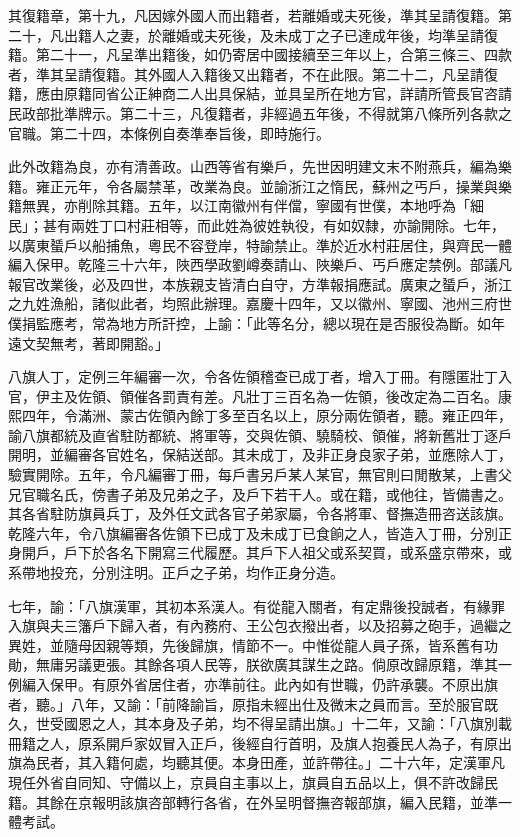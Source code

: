\begin{pinyinscope}
其復籍章，第十九，凡因嫁外國人而出籍者，若離婚或夫死後，準其呈請復籍。第二十，凡出籍人之妻，於離婚或夫死後，及未成丁之子已達成年後，均準呈請復籍。第二十一，凡呈準出籍後，如仍寄居中國接續至三年以上，合第三條三、四款者，準其呈請復籍。其外國人入籍後又出籍者，不在此限。第二十二，凡呈請復籍，應由原籍同省公正紳商二人出具保結，並具呈所在地方官，詳請所管長官咨請民政部批準牌示。第二十三，凡復籍者，非經過五年後，不得就第八條所列各款之官職。第二十四，本條例自奏準奉旨後，即時施行。

此外改籍為良，亦有清善政。山西等省有樂戶，先世因明建文末不附燕兵，編為樂籍。雍正元年，令各屬禁革，改業為良。並諭浙江之惰民，蘇州之丐戶，操業與樂籍無異，亦削除其籍。五年，以江南徽州有伴儅，寧國有世僕，本地呼為「細民」；甚有兩姓丁口村莊相等，而此姓為彼姓執役，有如奴隸，亦諭開除。七年，以廣東蜑戶以船捕魚，粵民不容登岸，特諭禁止。準於近水村莊居住，與齊民一體編入保甲。乾隆三十六年，陜西學政劉嶟奏請山、陜樂戶、丐戶應定禁例。部議凡報官改業後，必及四世，本族親支皆清白自守，方準報捐應試。廣東之蜑戶，浙江之九姓漁船，諸似此者，均照此辦理。嘉慶十四年，又以徽州、寧國、池州三府世僕捐監應考，常為地方所訐控，上諭：「此等名分，總以現在是否服役為斷。如年遠文契無考，著即開豁。」

八旗人丁，定例三年編審一次，令各佐領稽查已成丁者，增入丁冊。有隱匿壯丁入官，伊主及佐領、領催各罰責有差。凡壯丁三百名為一佐領，後改定為二百名。康熙四年，令滿洲、蒙古佐領內餘丁多至百名以上，原分兩佐領者，聽。雍正四年，諭八旗都統及直省駐防都統、將軍等，交與佐領、驍騎校、領催，將新舊壯丁逐戶開明，並編審各官姓名，保結送部。其未成丁，及非正身良家子弟，並應除人丁，驗實開除。五年，令凡編審丁冊，每戶書另戶某人某官，無官則曰閒散某，上書父兄官職名氏，傍書子弟及兄弟之子，及戶下若干人。或在籍，或他往，皆備書之。其各省駐防旗員兵丁，及外任文武各官子弟家屬，令各將軍、督撫造冊咨送該旗。乾隆六年，令八旗編審各佐領下已成丁及未成丁已食餉之人，皆造入丁冊，分別正身開戶，戶下於各名下開寫三代履歷。其戶下人祖父或系契買，或系盛京帶來，或系帶地投充，分別注明。正戶之子弟，均作正身分造。

七年，諭：「八旗漢軍，其初本系漢人。有從龍入關者，有定鼎後投誠者，有緣罪入旗與夫三籓戶下歸入者，有內務府、王公包衣撥出者，以及招募之砲手，過繼之異姓，並隨母因親等類，先後歸旗，情節不一。中惟從龍人員子孫，皆系舊有功勛，無庸另議更張。其餘各項人民等，朕欲廣其謀生之路。倘原改歸原籍，準其一例編入保甲。有原外省居住者，亦準前往。此內如有世職，仍許承襲。不原出旗者，聽。」八年，又諭：「前降諭旨，原指未經出仕及微末之員而言。至於服官既久，世受國恩之人，其本身及子弟，均不得呈請出旗。」十二年，又諭：「八旗別載冊籍之人，原系開戶家奴冒入正戶，後經自行首明，及旗人抱養民人為子，有原出旗為民者，其入籍何處，均聽其便。本身田產，並許帶往。」二十六年，定漢軍凡現任外省自同知、守備以上，京員自主事以上，旗員自五品以上，俱不許改歸民籍。其餘在京報明該旗咨部轉行各省，在外呈明督撫咨報部旗，編入民籍，並準一體考試。


\end{pinyinscope}
